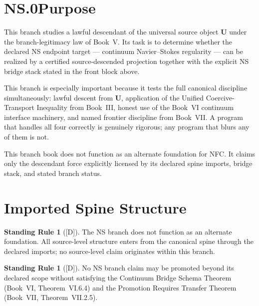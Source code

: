 \documentclass[12pt,oneside]{amsbook}
\theoremstyle{plain}
\theoremstyle{definition}
\newtheorem{standingrule}[theorem]{Standing Rule}
\theoremstyle{remark}
\newcommand{\status}[1]{\textup{[#1]}}
\begin{document}
\section*{NS.0\quad Purpose}

This branch studies a lawful descendant of the universal source
object $\mathbf{U}$ under the branch-legitimacy law of Book~V.
Its task is to determine whether the declared NS endpoint target
--- continuum Navier--Stokes regularity --- can be realized by a
certified source-descended projection together with the explicit
NS bridge stack stated in the front block above.

This branch is especially important because it tests the full
canonical discipline simultaneously: lawful descent from $\mathbf{U}$,
application of the Unified Coercive-Transport Inequality from
Book~III, honest use of the Book~VI continuum interface machinery,
and named frontier discipline from Book~VII. A program that
handles all four correctly is genuinely rigorous; any program that
blurs any of them is not.

This branch book does not function as an alternate foundation for
NFC. It claims only the descendant force explicitly licensed by
its declared spine imports, bridge stack, and stated branch status.

\section{Imported Spine Structure}

\begin{standingrule}[\status{D}]\label{sr:NS-no-alternate}
The NS branch does not function as an alternate foundation. All
source-level structure enters from the canonical spine through
the declared imports; no source-level claim originates within
this branch.
\end{standingrule}

\begin{standingrule}[\status{D}]\label{sr:NS-no-silent-promotion}
No NS branch claim may be promoted beyond its declared scope
without satisfying the Continuum Bridge Schema Theorem
(Book~VI, Theorem~VI.6.4) and the Promotion Requires Transfer
Theorem (Book~VII, Theorem~VII.2.5).
\end{standingrule}
\end{document}

